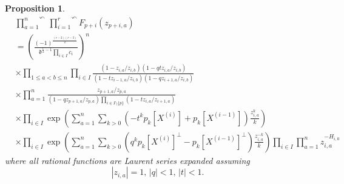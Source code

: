 \documentclass[10pt,a4paper]{amsart}
\newtheorem{prop}{Proposition}
\newcommand{\ddd}{\mathfrak{d}}
\begin{document}
\begin{prop}
\begin{equation}
\begin{aligned}
&\overset{\curvearrowleft}{\prod_{a=1}^n}\,\overset{\curvearrowleft}{\prod_{i=1}^{r}}F_{p+i}(z_{p+i,a})\\
&=\left( \frac{(-1)^{\frac{(r-2)(r-3)}{2}}}{\displaystyle\ddd^{\frac{r}{2}-1} \prod_{i\in I} c_i}\right)^n\\
&\times\prod_{1\le a<b\le n}\prod_{i\in I}
\frac{\left(1-z_{i,a}/z_{i,b}\right)\left(1-qtz_{i,a}/z_{i,b}\right)}{\left(1-tz_{i-1,a}/z_{i,b}\right)\left(1-qz_{i+1,a}/z_{i,b}\right)}\\
&\times \prod_{a=1}^n\frac{z_{p+1,a}/z_{p,a}}{\left(1-qz_{p+1,a}/z_{p,a}\right)
\prod_{i\in I\setminus\{p\}}
\left(1-tz_{i,a}/z_{i+1,a}\right)}\\
&\times\prod_{i\in I}\exp\left(\sum_{a=1}^n\sum_{k>0}\left(-t^{k}p_{k}[X^{(i)}]+p_k[X^{(i-1)}]\right)\frac{z_{i,a}^{k}}{k}\right)\\
&\times\prod_{i\in I}\exp\left(\sum_{a=1}^n\sum_{k>0}\left(q^{k}p_{k}[X^{(i)}]^\perp-p_k[X^{(i-1)}]^\perp\right)\frac{z_{i,a}^{-k}}{k}\right)
\prod_{i\in I}\prod_{a=1}^n z_{i,a}^{-H_{i,0}}
\end{aligned}
\label{FNormalOrder}
\end{equation}
where all rational functions are Laurent series expanded assuming 
\begin{equation}
|z_{i,a}|=1,\, |q|< 1,\, |t|<1.
\label{NormalFExpand}
\end{equation}
\end{prop}
\end{document}
